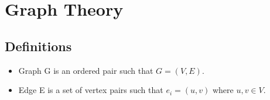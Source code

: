\chapter{Graph Theory}
\newpage

\section{Definitions}
\begin{itemize}
	\item Graph G is an ordered pair such that $G = (V,E)$.
	\item Edge E is a set of vertex pairs such that $e_i = (u,v)$ where $u,v \in V$.
\end{itemize}
\newpage


\newpage


\newpage


\newpage